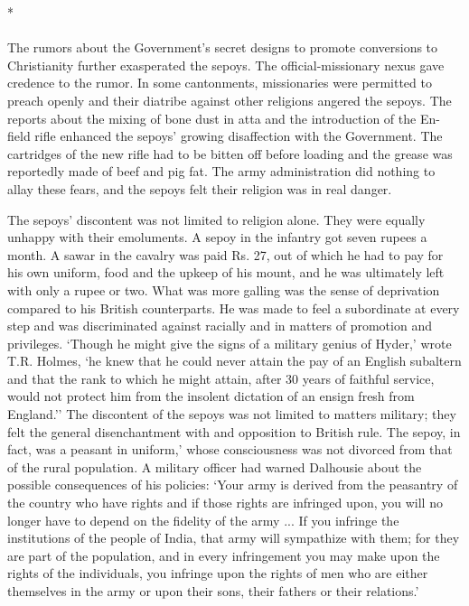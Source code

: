 \begin{center}*\end{center}

\paragraph*{}
The rumors about the Government's secret designs to promote conversions to Christianity further exasperated the sepoys. The official-missionary nexus gave credence to the rumor. In some cantonments, missionaries were permitted to preach openly and their diatribe against other religions angered the sepoys. The reports about the mixing of bone dust in atta and the introduction of the En-field rifle enhanced the sepoys' growing disaffection with the Government. The cartridges of the new rifle had to be bitten off before loading and the grease was reportedly made of beef and pig fat. The army administration did nothing to allay these fears, and the sepoys felt their religion was in real danger.

The sepoys' discontent was not limited to religion alone. They were equally unhappy with their emoluments. A sepoy in the infantry got seven rupees a month. A sawar in the cavalry was paid Rs. 27, out of which he had to pay for his own uniform, food and the upkeep of his mount, and he was ultimately left with only a rupee or two. What was more galling was the sense of deprivation compared to his British counterparts. He was made to feel a subordinate at every step and was discriminated against racially and in matters of promotion and privileges. `Though he might give the signs of a military genius of Hyder,' wrote T.R. Holmes, `he knew that he could never attain the pay of an English subaltern and that the rank to which he might attain, after 30 years of faithful service, would not protect him from the insolent dictation of an ensign fresh from England.'' The discontent of the sepoys was not limited to matters military; they felt the general disenchantment with and opposition to British rule. The sepoy, in fact, was a peasant in uniform,' whose consciousness was not divorced from that of the rural population. A military officer had warned Dalhousie about the possible consequences of his policies: `Your army is derived from the peasantry of the country who have rights and if those rights are infringed upon, you will no longer have to depend on the fidelity of the army ... If you infringe the institutions of the people of India, that army will sympathize with them; for they are part of the population, and in every infringement you may make upon the rights of the individuals, you infringe upon the rights of men who are either themselves in the army or upon their sons, their fathers or their relations.'

